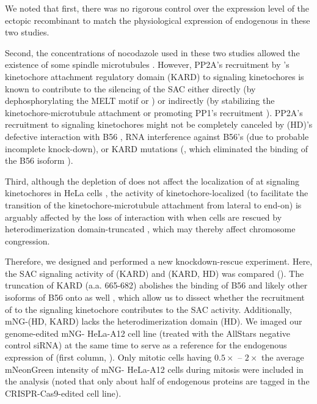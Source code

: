We noted that first, there was no rigorous control over the expression level of the ectopic recombinant  to match the physiological expression of endogenous  in these two studies.

Second, the concentrations of nocodazole used in these two studies allowed the existence of some spindle microtubules \cite{100nMNoc}. However, PP2A's recruitment by 's kinetochore attachment regulatory domain (KARD) to signaling kinetochores is known to contribute to the silencing of the SAC either directly (by dephosphorylating the MELT motif \cite{PP2ADephosphorylatesKNL1} or  \cite{PP2ADephosphorylatesBUB1}) or indirectly (by stabilizing the kinetochore-microtubule attachment \cite{BUBR1_KT-MT, Suijkerbuijk2012, BUBR1-L669A+I672A, PP2A-B56-BUBR1ChromosomeCongression_Xu2013} or promoting PP1's recruitment \cite{PP2A-B56}). PP2A's recruitment to signaling kinetochores might not be completely canceled by (\textDelta{}HD)'s defective interaction with B56 \cite{BubBiochem}, RNA interference against B56's (due to probable incomplete knock-down), or KARD mutations (\cite{BubR1TwoPools}, which eliminated the binding of the B56\textalpha{} isoform \cite{BUBR1-L669A+I672A}).

Third, although the depletion of  does not affect the localization of  at signaling kinetochores in HeLa cells \cite{CENPELocalization-BUBR1}, the activity of kinetochore-localized  (to facilitate the transition of the kinetochore-microtubule attachment from lateral to end-on) is arguably affected by the loss of interaction with  \cite{CENPEActivity-BUBR1} when cells are rescued by heterodimerization domain-truncated , which may thereby affect chromosome congression. %

Therefore, we designed and performed a new  knockdown-rescue experiment. Here, the SAC signaling activity of (\textDelta{}KARD) and (\textDelta{}KARD, \textDelta{}HD) was compared (). The truncation of KARD (a.a. 665-682) abolishes the binding of B56\textalpha{} \cite{Suijkerbuijk2012} and likely other isoforms of B56 onto  as well \cite{B56-SLiM, PP2A-B56-BUBR1Structure}, which allow us to dissect whether the recruitment of  to the signaling kinetochore  contributes to the SAC activity. Additionally, mNG-(\textDelta{}HD, \textDelta{}KARD) lacks the heterodimerization domain (HD). We imaged our genome-edited mNG- HeLa-A12 cell line (treated with the AllStars negative control siRNA) at the same time to serve as a reference for the endogenous expression of  (first column, ). Only mitotic cells having $0.5\times$ -- $2\times$ the average mNeonGreen intensity of mNG- HeLa-A12 cells during mitosis were included in the analysis (noted that only about half of endogenous  proteins are tagged in the CRISPR-Cas9-edited cell line).


